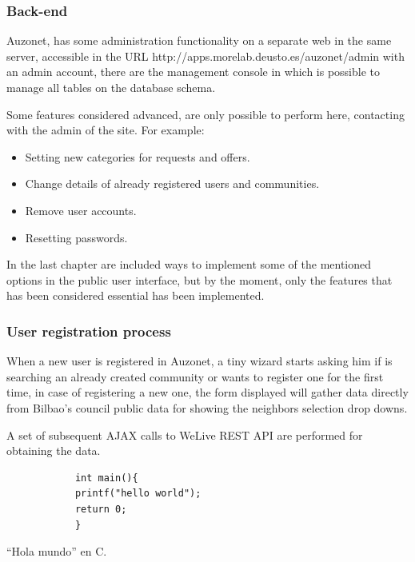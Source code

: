 \documentclass{DeustoFDP}
\begin{document}
\subsubsection{Back-end}
Auzonet, has some administration functionality on a separate web in the same server, accessible in the URL http://apps.morelab.deusto.es/auzonet/admin with an admin account, there are the management console in which is possible to manage all tables on the database schema.

Some features considered advanced, are only possible to perform here, contacting with the admin of the site. For example:

\begin{itemize}
	\item Setting new categories for requests and offers.
	\item Change details of already registered users and communities.
	\item Remove user accounts.
	\item Resetting passwords.
\end{itemize}

In the last chapter are included ways to implement some of the mentioned options in the public user interface, but by the moment, only the features that has been considered essential has been implemented.

\subsubsection{User registration process}
When a new user is registered in Auzonet, a tiny wizard starts asking him if is searching an already created community or wants to register one for the first time, in case of registering a new one, the form displayed will gather data directly from Bilbao's council public data for showing the neighbors selection drop downs.

A set of subsequent AJAX calls to WeLive REST API are performed for obtaining the data.

\begin{listing}\centering
	\begin{minipage}{.4\textwidth}
		\begin{verbatim}
			int main(){
			printf("hello world");
			return 0;
			}
		\end{verbatim}
	\end{minipage}
	\caption{\enquote{Hola mundo} en C.}\label{lst:holamundo}
\end{listing}
\end{document}
